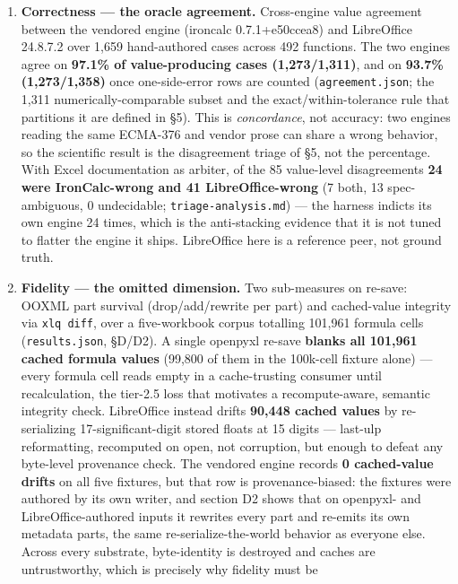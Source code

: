 \documentclass[
]{article}
\begin{document}
\begin{enumerate}
\def\labelenumi{\arabic{enumi}.}
\item
  \textbf{Correctness --- the oracle agreement.} Cross-engine value
  agreement between the vendored engine (ironcalc 0.7.1+e50ccea8) and
  LibreOffice 24.8.7.2 over 1,659 hand-authored cases across 492
  functions. The two engines agree on \textbf{97.1\% of value-producing
  cases (1,273/1,311)}, and on \textbf{93.7\% (1,273/1,358)} once
  one-side-error rows are counted (\texttt{agreement.json}; the 1,311
  numerically-comparable subset and the exact/within-tolerance rule that
  partitions it are defined in §5). This is \emph{concordance}, not
  accuracy: two engines reading the same ECMA-376 and vendor prose can
  share a wrong behavior, so the scientific result is the disagreement
  triage of §5, not the percentage. With Excel documentation as arbiter,
  of the 85 value-level disagreements \textbf{24 were IronCalc-wrong and
  41 LibreOffice-wrong} (7 both, 13 spec-ambiguous, 0 undecidable;
  \texttt{triage-analysis.md}) --- the harness indicts its own engine 24
  times, which is the anti-stacking evidence that it is not tuned to
  flatter the engine it ships. LibreOffice here is a reference peer, not
  ground truth.
\item
  \textbf{Fidelity --- the omitted dimension.} Two sub-measures on
  re-save: OOXML part survival (drop/add/rewrite per part) and
  cached-value integrity via \texttt{xlq\ diff}, over a five-workbook
  corpus totalling 101,961 formula cells (\texttt{results.json}, §D/D2).
  A single openpyxl re-save \textbf{blanks all 101,961 cached formula
  values} (99,800 of them in the 100k-cell fixture alone) --- every
  formula cell reads empty in a cache-trusting consumer until
  recalculation, the tier-2.5 loss that motivates a recompute-aware,
  semantic integrity check. LibreOffice instead drifts \textbf{90,448
  cached values} by re-serializing 17-significant-digit stored floats at
  15 digits --- last-ulp reformatting, recomputed on open, not
  corruption, but enough to defeat any byte-level provenance check. The
  vendored engine records \textbf{0 cached-value drifts} on all five
  fixtures, but that row is provenance-biased: the fixtures were
  authored by its own writer, and section D2 shows that on openpyxl- and
  LibreOffice-authored inputs it rewrites every part and re-emits its
  own metadata parts, the same re-serialize-the-world behavior as
  everyone else. Across every substrate, byte-identity is destroyed and
  caches are untrustworthy, which is precisely why fidelity must be

\end{enumerate}
\end{document}
